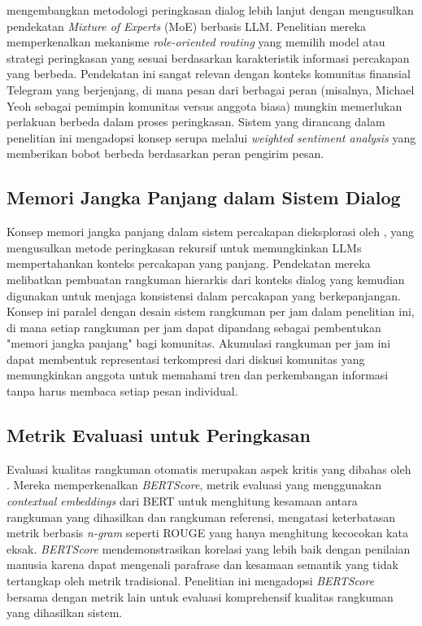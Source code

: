 \textcite{tian2024} mengembangkan metodologi peringkasan dialog lebih lanjut dengan mengusulkan pendekatan \textit{Mixture of Experts} (MoE) berbasis LLM. Penelitian mereka memperkenalkan mekanisme \textit{role-oriented routing} yang memilih model atau strategi peringkasan yang sesuai berdasarkan karakteristik informasi percakapan yang berbeda. Pendekatan ini sangat relevan dengan konteks komunitas finansial Telegram yang berjenjang, di mana pesan dari berbagai peran (misalnya, Michael Yeoh sebagai pemimpin komunitas versus anggota biasa) mungkin memerlukan perlakuan berbeda dalam proses peringkasan. Sistem yang dirancang dalam penelitian ini mengadopsi konsep serupa melalui \textit{weighted sentiment analysis} yang memberikan bobot berbeda berdasarkan peran pengirim pesan.

\subsection{Memori Jangka Panjang dalam Sistem Dialog}

Konsep memori jangka panjang dalam sistem percakapan dieksplorasi oleh \textcite{wang2023recursive}, yang mengusulkan metode peringkasan rekursif untuk memungkinkan LLMs mempertahankan konteks percakapan yang panjang. Pendekatan mereka melibatkan pembuatan rangkuman hierarkis dari konteks dialog yang kemudian digunakan untuk menjaga konsistensi dalam percakapan yang berkepanjangan. Konsep ini paralel dengan desain sistem rangkuman per jam dalam penelitian ini, di mana setiap rangkuman per jam dapat dipandang sebagai pembentukan "memori jangka panjang" bagi komunitas. Akumulasi rangkuman per jam ini dapat membentuk representasi terkompresi dari diskusi komunitas yang memungkinkan anggota untuk memahami tren dan perkembangan informasi tanpa harus membaca setiap pesan individual.

\subsection{Metrik Evaluasi untuk Peringkasan}

Evaluasi kualitas rangkuman otomatis merupakan aspek kritis yang dibahas oleh \textcite{zhang2020bertscore}. Mereka memperkenalkan \textit{BERTScore}, metrik evaluasi yang menggunakan \textit{contextual embeddings} dari BERT untuk menghitung kesamaan antara rangkuman yang dihasilkan dan rangkuman referensi, mengatasi keterbatasan metrik berbasis \textit{n-gram} seperti ROUGE yang hanya menghitung kecocokan kata eksak. \textit{BERTScore} mendemonstrasikan korelasi yang lebih baik dengan penilaian manusia karena dapat mengenali parafrase dan kesamaan semantik yang tidak tertangkap oleh metrik tradisional. Penelitian ini mengadopsi \textit{BERTScore} bersama dengan metrik lain untuk evaluasi komprehensif kualitas rangkuman yang dihasilkan sistem.

